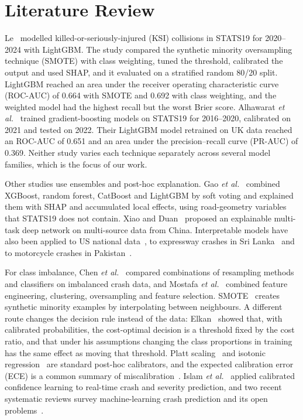 \documentclass[conference,letterpaper]{IEEEtran}
\begin{document}
\section{Literature Review}

Le~\cite{le2026ksi} modelled killed-or-seriously-injured (KSI) collisions in STATS19 for 2020--2024 with LightGBM. The study compared the synthetic minority oversampling technique (SMOTE) with class weighting, tuned the threshold, calibrated the output and used SHAP, and it evaluated on a stratified random 80/20 split. LightGBM reached an area under the receiver operating characteristic curve (ROC-AUC) of 0.664 with SMOTE and 0.692 with class weighting, and the weighted model had the highest recall but the worst Brier score. Alhawarat \textit{et al.}~\cite{alhawarat2026calibrated} trained gradient-boosting models on STATS19 for 2016--2020, calibrated on 2021 and tested on 2022. Their LightGBM model retrained on UK data reached an ROC-AUC of 0.651 and an area under the precision--recall curve (PR-AUC) of 0.369. Neither study varies each technique separately across several model families, which is the focus of our work.

Other studies use ensembles and post-hoc explanation. Gao \textit{et al.}~\cite{gao2026ensemble} combined XGBoost, random forest, CatBoost and LightGBM by soft voting and explained them with SHAP and accumulated local effects, using road-geometry variables that STATS19 does not contain. Xiao and Duan~\cite{xiao2025multitask} proposed an explainable multi-task deep network on multi-source data from China. Interpretable models have also been applied to US national data~\cite{abdulrashid2025interpretable}, to expressway crashes in Sri Lanka~\cite{madushani2023expressway} and to motorcycle crashes in Pakistan~\cite{mansoor2023motorcycle}.

For class imbalance, Chen \textit{et al.}~\cite{chen2025imbalanced} compared combinations of resampling methods and classifiers on imbalanced crash data, and Mostafa \textit{et al.}~\cite{mostafa2025ai} combined feature engineering, clustering, oversampling and feature selection. SMOTE~\cite{chawla2002smote} creates synthetic minority examples by interpolating between neighbours. A different route changes the decision rule instead of the data: Elkan~\cite{elkan2001foundations} showed that, with calibrated probabilities, the cost-optimal decision is a threshold fixed by the cost ratio, and that under his assumptions changing the class proportions in training has the same effect as moving that threshold. Platt scaling~\cite{platt1999probabilistic} and isotonic regression~\cite{zadrozny2002transforming} are standard post-hoc calibrators, and the expected calibration error (ECE) is a common summary of miscalibration~\cite{guo2017calibration}. Islam \textit{et al.}~\cite{islam2024calibrated} applied calibrated confidence learning to real-time crash and severity prediction, and two recent systematic reviews survey machine-learning crash prediction and its open problems~\cite{chai2024review,ali2024review}.
\end{document}
